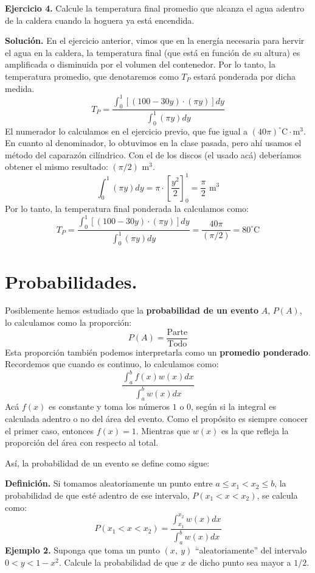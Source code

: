 \documentclass[12pt]{article}
\begin{document}
\textbf{Ejercicio 4.} Calcule la temperatura final promedio que alcanza el agua adentro de la caldera cuando la hoguera ya está encendida.

\textbf{Solución.} En el ejercicio anterior, vimos que en la energía necesaria para hervir el agua en la caldera, la temperatura final (que está en función de su altura) es amplificada o disminuida por el volumen del contenedor. Por lo tanto, la temperatura promedio, que denotaremos como $T_{P}$ estará ponderada por dicha medida.
\[
  T_{P} = \frac{\int_{0}^{1} [(100 - 30y) \cdot (\pi y)] dy}{\int_{0}^{1} (\pi y) dy}
\]
El numerador lo calculamos en el ejercicio previo, que fue igual a $(40 \pi)^{\circ} \text{C} \cdot \text{m}^{3}$. En cuanto al denominador, lo obtuvimos en la clase pasada, pero ahí usamos el método del caparazón cilíndrico. Con el de los discos (el usado acá) deberíamos obtener el mismo resultado: $(\pi/2) \text{ m}^{3}$.
\[
  \int_{0}^{1} (\pi y)dy = \pi \cdot \left[\frac{y^{2}}{2}\right]_{0}^{1} = \frac{\pi}{2} \text{ m}^{3}
\]
Por lo tanto, la temperatura final ponderada la calculamos como:
\[
  T_{P} = \frac{\int_{0}^{1} [(100 - 30y) \cdot (\pi y)] dy}{\int_{0}^{1} (\pi y) dy}
        = \frac{40 \pi}{(\pi/2)}
        = 80^{\circ} \text{C}
\]


\section{Probabilidades.}

Posiblemente hemos estudiado que la \textbf{probabilidad de un evento} $A$, $P(A)$, lo calculamos como la proporción:
\[
  P(A) = \frac{\text{Parte}}{\text{Todo}}
\]
Esta proporción también podemos interpretarla como un \textbf{promedio ponderado}. Recordemos que cuando es continuo, lo calculamos como:
\[
  \frac{\int_{a}^{b} f(x)w(x) dx}{\int_{a}^{b} w(x)dx}
\]
Acá $f(x)$ es constante y toma los números $1$ o $0$, según si la integral es calculada adentro o no del área del evento. Como el propósito es siempre conocer el primer caso, entonces $f(x) = 1$. Mientras que $w(x)$ es la que refleja la proporción del área con respecto al total.

Así, la probabilidad de un evento se define como sigue:

\textbf{Definición.} Si tomamos aleatoriamente un punto entre $a \leq x_{1} < x_{2} \leq b$, la probabilidad de que esté adentro de ese intervalo, $P(x_{1} < x < x_{2})$, se calcula como:
\[
  P(x_{1} < x < x_{2}) = \frac{\int_{x_{1}}^{x_{2}} w(x)dx}{\int_{a}^{b} w(x)dx}
\]
\textbf{Ejemplo 2.} Suponga que toma un punto $(x, \ y)$ ``aleatoriamente'' del intervalo $0 < y < 1-x^{2}$. Calcule la probabilidad de que $x$ de dicho punto sea mayor a $1/2$.
\end{document}
